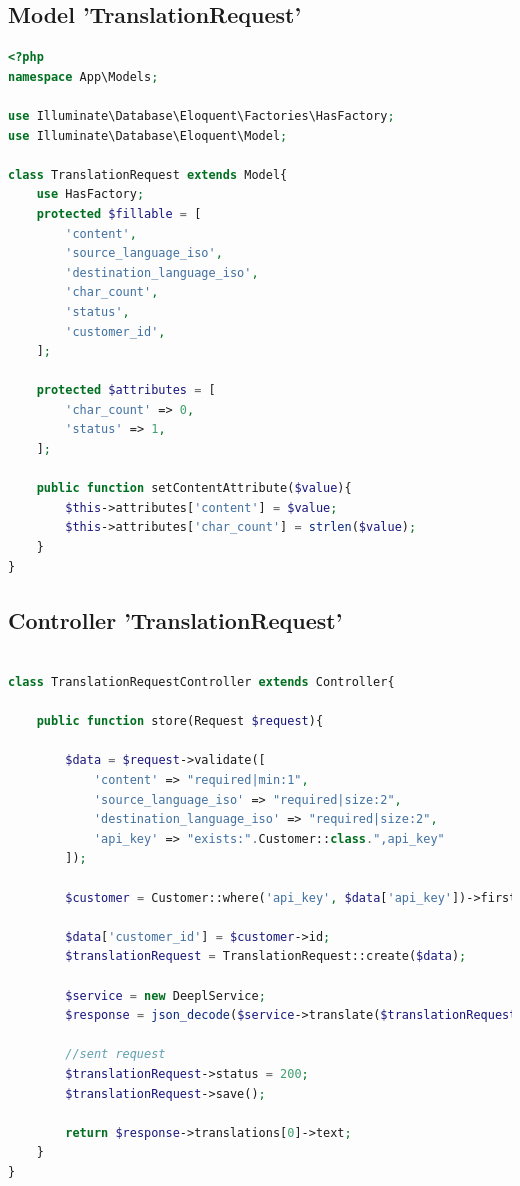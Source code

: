 \subsection{Model 'TranslationRequest'}
\label{sec:model_translation_request}
\begin{lstlisting}[language=php]
<?php
namespace App\Models;

use Illuminate\Database\Eloquent\Factories\HasFactory;
use Illuminate\Database\Eloquent\Model;

class TranslationRequest extends Model{
    use HasFactory;
    protected $fillable = [
        'content',
        'source_language_iso',
        'destination_language_iso',
        'char_count',
        'status',
        'customer_id',
    ];

    protected $attributes = [
        'char_count' => 0,
        'status' => 1,
    ];
    
    public function setContentAttribute($value){
        $this->attributes['content'] = $value;
        $this->attributes['char_count'] = strlen($value);
    }
}
\end{lstlisting}

\newpage
\subsection{Controller 'TranslationRequest'}
\label{sec:controller_translation_request}
\begin{lstlisting}[language=php]

class TranslationRequestController extends Controller{

    public function store(Request $request){

        $data = $request->validate([
            'content' => "required|min:1",
            'source_language_iso' => "required|size:2",
            'destination_language_iso' => "required|size:2",
            'api_key' => "exists:".Customer::class.",api_key"
        ]);

        $customer = Customer::where('api_key', $data['api_key'])->firstOrFail();

        $data['customer_id'] = $customer->id;
        $translationRequest = TranslationRequest::create($data);
        
        $service = new DeeplService;
        $response = json_decode($service->translate($translationRequest));
        
        //sent request
        $translationRequest->status = 200;
        $translationRequest->save();
        
        return $response->translations[0]->text;
    }
}
\end{lstlisting}

